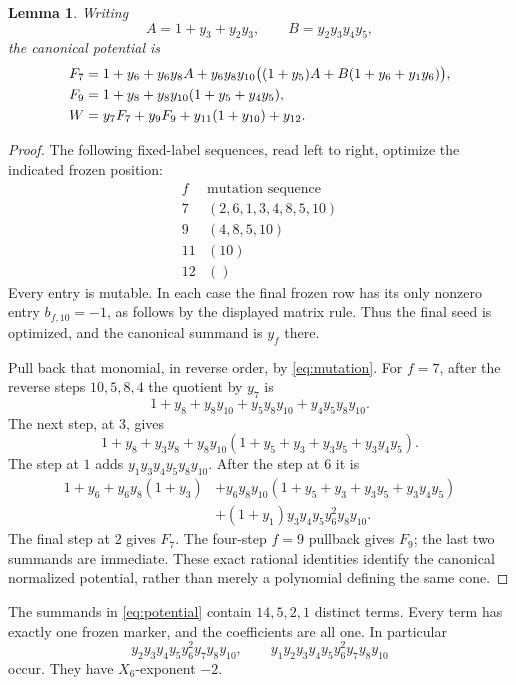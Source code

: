 \documentclass[11pt]{article}
\newtheorem{lemma}{Lemma}
\begin{document}
\begin{lemma}\label{lem:potential}
Writing
\[
 A=1+y_3+y_2y_3,\qquad B=y_2y_3y_4y_5,
\]
the canonical potential is
\begin{align}
 F_7&=1+y_6+y_6y_8A+
 y_6y_8y_{10}\big((1+y_5)A+B(1+y_6+y_1y_6)\big),\notag\\
 F_9&=1+y_8+y_8y_{10}(1+y_5+y_4y_5),\notag\\
 W&=y_7F_7+y_9F_9+y_{11}(1+y_{10})+y_{12}. \label{eq:potential}
\end{align}
\end{lemma}
\begin{proof}
The following fixed-label sequences, read left to right, optimize the
indicated frozen position:
\[
\begin{array}{c|l}
f&\text{mutation sequence}\\ \hline
7&(2,6,1,3,4,8,5,10)\\
9&(4,8,5,10)\\
11&(10)\\
12&()
\end{array}
\]
Every entry is mutable. In each case the final frozen row has its only
nonzero entry $b_{f,10}=-1$, as follows by the displayed matrix rule.
Thus the final seed is optimized, and the canonical summand is $y_f$ there.

Pull back that monomial, in reverse order, by \eqref{eq:mutation}.
For $f=7$, after the reverse steps $10,5,8,4$ the quotient by $y_7$ is
\[
1+y_8+y_8y_{10}+y_5y_8y_{10}+y_4y_5y_8y_{10}.
\]
The next step, at $3$, gives
\[
1+y_8+y_3y_8+y_8y_{10}
 (1+y_5+y_3+y_3y_5+y_3y_4y_5).
\]
The step at $1$ adds $y_1y_3y_4y_5y_8y_{10}$. After the step at $6$ it is
\begin{align*}
1+y_6+y_6y_8(1+y_3)
&+y_6y_8y_{10}(1+y_5+y_3+y_3y_5+y_3y_4y_5)\\
&+(1+y_1)y_3y_4y_5y_6^2y_8y_{10}.
\end{align*}
The final step at $2$ gives $F_7$. The four-step $f=9$ pullback gives $F_9$;
the last two summands are immediate. These exact rational identities
identify the canonical normalized potential, rather than merely a
polynomial defining the same cone.
\end{proof}

The summands in \eqref{eq:potential} contain $14,5,2,1$ distinct terms.
Every term has exactly one frozen marker, and the coefficients are all one.
In particular
\[
 y_2y_3y_4y_5y_6^2y_7y_8y_{10},
 \qquad y_1y_2y_3y_4y_5y_6^2y_7y_8y_{10}
\]
occur. They have $X_6$-exponent $-2$.
\end{document}
